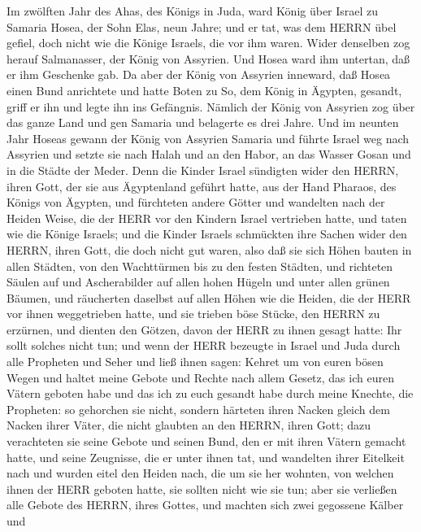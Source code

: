  Im zwölften Jahr des Ahas, des Königs in Juda, ward König
über Israel zu Samaria Hosea, der Sohn Elas, neun Jahre; 
und er tat, was dem HERRN übel gefiel, doch nicht wie die Könige
Israels, die vor ihm waren.  Wider denselben zog herauf
Salmanasser, der König von Assyrien. Und Hosea ward ihm untertan, daß er
ihm Geschenke gab.  Da aber der König von Assyrien inneward,
daß Hosea einen Bund anrichtete und hatte Boten zu So, dem König in
Ägypten, gesandt, griff er ihn und legte ihn ins Gefängnis. 
Nämlich der König von Assyrien zog über das ganze Land und gen Samaria
und belagerte es drei Jahre.  Und im neunten Jahr Hoseas
gewann der König von Assyrien Samaria und führte Israel weg nach
Assyrien und setzte sie nach Halah und an den Habor, an das Wasser Gosan
und in die Städte der Meder.  Denn die Kinder Israel
sündigten wider den HERRN, ihren Gott, der sie aus Ägyptenland geführt
hatte, aus der Hand Pharaos, des Königs von Ägypten, und fürchteten
andere Götter  und wandelten nach der Heiden Weise, die der
HERR vor den Kindern Israel vertrieben hatte, und taten wie die Könige
Israels;  und die Kinder Israels schmückten ihre Sachen
wider den HERRN, ihren Gott, die doch nicht gut waren, also daß sie sich
Höhen bauten in allen Städten, von den Wachttürmen bis zu den festen
Städten,  und richteten Säulen auf und Ascherabilder auf
allen hohen Hügeln und unter allen grünen Bäumen,  und
räucherten daselbst auf allen Höhen wie die Heiden, die der HERR vor
ihnen weggetrieben hatte, und sie trieben böse Stücke, den HERRN zu
erzürnen,  und dienten den Götzen, davon der HERR zu ihnen
gesagt hatte: Ihr sollt solches nicht tun;  und wenn der
HERR bezeugte in Israel und Juda durch alle Propheten und Seher und ließ
ihnen sagen: Kehret um von euren bösen Wegen und haltet meine Gebote und
Rechte nach allem Gesetz, das ich euren Vätern geboten habe und das ich
zu euch gesandt habe durch meine Knechte, die Propheten: 
so gehorchen sie nicht, sondern härteten ihren Nacken gleich dem Nacken
ihrer Väter, die nicht glaubten an den HERRN, ihren Gott; 
dazu verachteten sie seine Gebote und seinen Bund, den er mit ihren
Vätern gemacht hatte, und seine Zeugnisse, die er unter ihnen tat, und
wandelten ihrer Eitelkeit nach und wurden eitel den Heiden nach, die um
sie her wohnten, von welchen ihnen der HERR geboten hatte, sie sollten
nicht wie sie tun;  aber sie verließen alle Gebote des
HERRN, ihres Gottes, und machten sich zwei gegossene Kälber und
